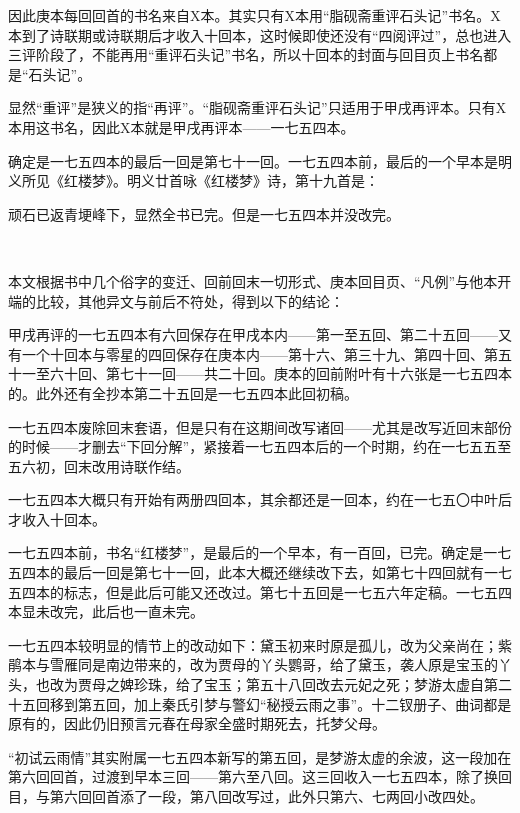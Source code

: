 \par 因此庚本每回回首的书名来自X本。其实只有X本用“脂砚斋重评石头记”书名。X本到了诗联期或诗联期后才收入十回本，这时候即使还没有“四阅评过”，总也进入三评阶段了，不能再用“重评石头记”书名，所以十回本的封面与回目页上书名都是“石头记”。
\par 显然“重评”是狭义的指“再评”。“脂砚斋重评石头记”只适用于甲戌再评本。只有X本用这书名，因此X本就是甲戌再评本——一七五四本。
\par 确定是一七五四本的最后一回是第七十一回。一七五四本前，最后的一个早本是明义所见《红楼梦》。明义廿首咏《红楼梦》诗，第十九首是：
\par 顽石已返青埂峰下，显然全书已完。但是一七五四本并没改完。
\par  
\par 本文根据书中几个俗字的变迁、回前回末一切形式、庚本回目页、“凡例”与他本开端的比较，其他异文与前后不符处，得到以下的结论：
\par 甲戌再评的一七五四本有六回保存在甲戌本内——第一至五回、第二十五回——又有一个十回本与零星的四回保存在庚本内——第十六、第三十九、第四十回、第五十一至六十回、第七十一回——共二十回。庚本的回前附叶有十六张是一七五四本的。此外还有全抄本第二十五回是一七五四本此回初稿。
\par 一七五四本废除回末套语，但是只有在这期间改写诸回——尤其是改写近回末部份的时候——才删去“下回分解”，紧接着一七五四本后的一个时期，约在一七五五至五六初，回末改用诗联作结。
\par 一七五四本大概只有开始有两册四回本，其余都还是一回本，约在一七五〇中叶后才收入十回本。
\par 一七五四本前，书名“红楼梦”，是最后的一个早本，有一百回，已完。确定是一七五四本的最后一回是第七十一回，此本大概还继续改下去，如第七十四回就有一七五四本的标志，但是此后可能又还改过。第七十五回是一七五六年定稿。一七五四本显未改完，此后也一直未完。
\par 一七五四本较明显的情节上的改动如下：黛玉初来时原是孤儿，改为父亲尚在；紫鹃本与雪雁同是南边带来的，改为贾母的丫头鹦哥，给了黛玉，袭人原是宝玉的丫头，也改为贾母之婢珍珠，给了宝玉；第五十八回改去元妃之死；梦游太虚自第二十五回移到第五回，加上秦氏引梦与警幻“秘授云雨之事”。十二钗册子、曲词都是原有的，因此仍旧预言元春在母家全盛时期死去，托梦父母。
\par “初试云雨情”其实附属一七五四本新写的第五回，是梦游太虚的余波，这一段加在第六回回首，过渡到早本三回——第六至八回。这三回收入一七五四本，除了换回目，与第六回回首添了一段，第八回改写过，此外只第六、七两回小改四处。
